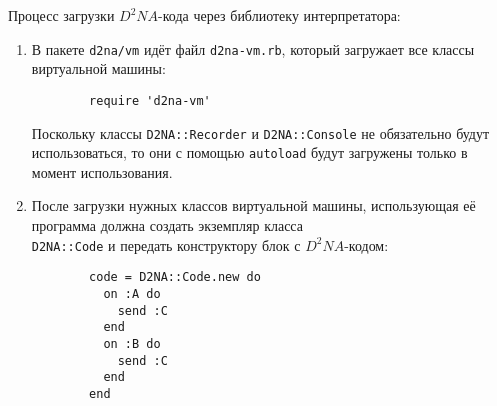 \documentclass[utf8,a5paper,portrait,10pt]{eskdtext}
\begin{document}
Процесс загрузки $D^2NA$-кода через библиотеку интерпретатора:
\begin{enumerate}
  \item В пакете \texttt{d2na/vm} идёт файл \texttt{d2na-vm.rb}, который
        загружает все классы виртуальной машины:

        \begin{verbatim}
        require 'd2na-vm'
        \end{verbatim}

        Поскольку классы \texttt{D2NA::Recorder} и \texttt{D2NA::Console} не
        обязательно будут использоваться, то они с помощью \texttt{autoload}
        будут загружены только в момент использования.
  \item После загрузки нужных классов виртуальной машины, использующая её 
        программа должна создать экземпляр класса\\ \texttt{D2NA::Code} и
        передать конструктору блок с $D^2NA$-кодом:

        \begin{verbatim}
        code = D2NA::Code.new do
          on :A do
            send :C
          end
          on :B do
            send :C
          end
        end
        \end{verbatim}


\end{enumerate}
\end{document}
